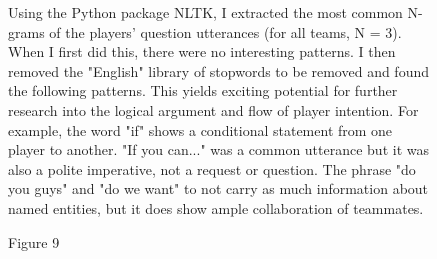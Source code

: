 

\begin{figure}[h!]
    \centering
    \caption{Using the Python package NLTK, I extracted the most common N-grams of the players' question utterances (for all teams, N = 3). When I first did this, there were no interesting patterns. I then removed the "English" library of stopwords to be removed and found the following patterns. This yields exciting potential for further research into the logical argument and flow of player intention. For example, the word "if" shows a conditional statement from one player to another. "If you can..." was a common utterance but it was also a polite imperative, not a request or question. The phrase "do you guys" and "do we want" to not carry as much information about named entities, but it does show ample collaboration of teammates. }
\end{figure}








\newpage



\begin{figure}[h!]
    \centering
    \caption{Figure 9}
\end{figure}




